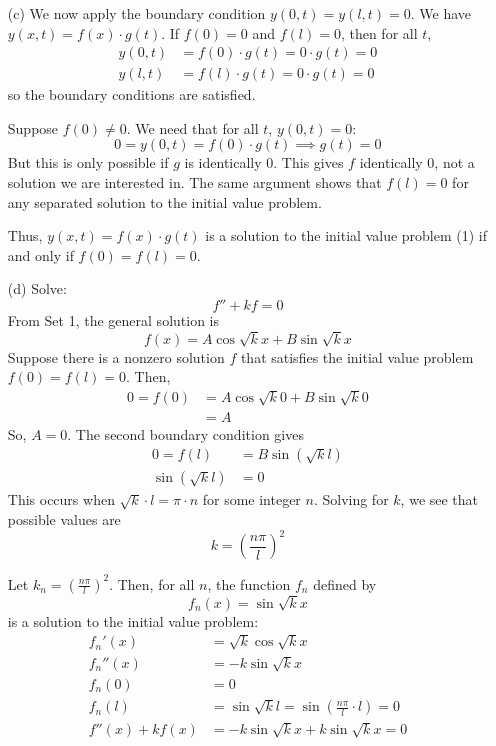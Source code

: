 \documentclass[12pt, reqno]{amsart}
\theoremstyle{definition}
\theoremstyle{remark}
\begin{document}
\begin{itemize}
\begin{itemize}
\vspace{0.1 cm}
\item[(c)] We now apply the boundary condition $y(0,t)=y(l,t)=0$. We have $y(x,t)=f(x)\cdot g(t)$. If $f(0)=0$ and $f(l)=0$, then for all $t$, \begin{align*}
    y(0,t)&= f(0)\cdot g(t)=0\cdot g(t)=0\\
    y(l,t)&= f(l)\cdot g(t)=0\cdot g(t)=0
    \end{align*}
    so the boundary conditions are satisfied. 
    
    Suppose $f(0)\ne0$. We need that for all $t$, $y(0,t)=0$: $$0=y(0,t)=f(0)\cdot g(t)\implies g(t)=0$$But this is only possible if $g$ is identically 0. This gives $f$ identically 0, not a solution we are interested in. The same argument shows that $f(l)=0$ for any separated solution to the initial value problem.
    
    Thus, $y(x,t)=f(x)\cdot g(t)$ is a solution to the initial value problem (1) if and only if $f(0)=f(l)=0$. 
    
    

\vspace{0.1 cm}
\item[(d)] Solve: $$f''+kf=0$$
From Set 1, the general solution is $$f(x)=A\cos \sqrt{k}x+B\sin \sqrt{k}x$$
Suppose there is a nonzero solution $f$ that satisfies the initial value problem $f(0)=f(l)=0$. Then, \begin{align*}
0=f(0)&= A\cos \sqrt{k}0+B\sin \sqrt{k}0\\
&= A
\end{align*}
So, $A=0$. The second boundary condition gives \begin{align*}
0=f(l)&= B\sin(\sqrt{k}l)\\
\sin(\sqrt{k}l)&= 0
\end{align*}
This occurs when $\sqrt{k}\cdot l=\pi\cdot n$ for some integer $n$. Solving for $k$, we see that possible values are $$k= \left(\frac{n\pi}{l}\right)^{2}$$

Let $k_{n}=\left(\frac{n\pi}{l}\right)^{2}$. Then, for all $n$, the function $f_n$ defined by $$f_{n}(x)=\sin \sqrt{k}x$$is a solution to the initial value problem: \begin{align*}
f_{n}'(x)&= \sqrt{k}\cos \sqrt{k}x\\
f_{n}''(x)&= -k\sin \sqrt{k}x\\
f_{n}(0)&= 0\\
f_{n}(l)&= \sin \sqrt{k}l=\sin\left(\frac{n\pi}{l}\cdot l\right)=0\\
f''(x)+kf(x)&= -k\sin \sqrt{k}x+k\sin \sqrt{k}x=0
\end{align*}


\end{itemize}
\end{itemize}
\end{document}
